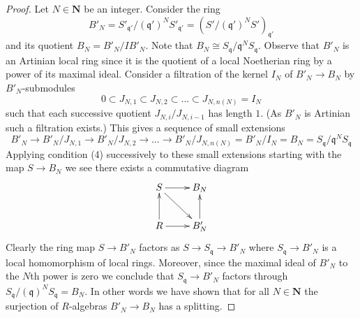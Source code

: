 \documentclass[10pt,a4paper]{amsart}
\theoremstyle{plain}
\theoremstyle{definition}
\theoremstyle{remark}
\numberwithin{equation}{subsection}
\begin{document}
\begin{proof}
\medskip\noindent
Let $N \in \mathbf{N}$ be an integer.
Consider the ring
$$
B'_N = S'_{\mathfrak q'} / (\mathfrak q')^N S'_{\mathfrak q'}
= (S'/(\mathfrak q')^N S')_{\mathfrak q'}
$$
and its quotient $B_N = B'_N/IB'_N$. Note that
$B_N \cong S_{\mathfrak q}/\mathfrak q^NS_{\mathfrak q}$.
Observe that $B'_N$ is an Artinian local ring since it is the
quotient of a local Noetherian ring by a power of its maximal ideal.
Consider a filtration of the kernel $I_N$ of $B'_N \to B_N$
by $B'_N$-submodules
$$
0 \subset J_{N, 1} \subset J_{N, 2} \subset \ldots \subset J_{N, n(N)} = I_N
$$
such that each successive quotient $J_{N, i}/J_{N, i - 1}$ has length $1$.
(As $B'_N$ is Artinian such a filtration exists.)
This gives a sequence of small extensions
$$
B'_N  \to B'_N/J_{N, 1} \to B'_N/J_{N, 2} \to \ldots \to
B'_N/J_{N, n(N)} = B'_N/I_N
= B_N = S_{\mathfrak q}/\mathfrak q^NS_{\mathfrak q}
$$
Applying condition (4) successively to these small extensions
starting with the map $S \to B_N$ we see there
exists a commutative diagram
$$
\xymatrix{
S \ar[r] \ar[rd] & B_N  \\
R \ar[r] \ar[u] & B'_N \ar[u]
}
$$
Clearly the ring map $S \to B'_N$ factors as $S \to S_{\mathfrak q} \to B'_N$
where $S_{\mathfrak q} \to B'_N$ is a local homomorphism of local rings.
Moreover, since the maximal ideal of $B'_N$ to the $N$th power is zero
we conclude that $S_{\mathfrak q} \to B'_N$ factors through
$S_{\mathfrak q}/(\mathfrak q)^NS_{\mathfrak q} = B_N$. In other words
we have shown that for all $N \in \mathbf{N}$ the surjection of
$R$-algebras $B'_N \to B_N$ has a splitting.


\end{proof}
\end{document}
